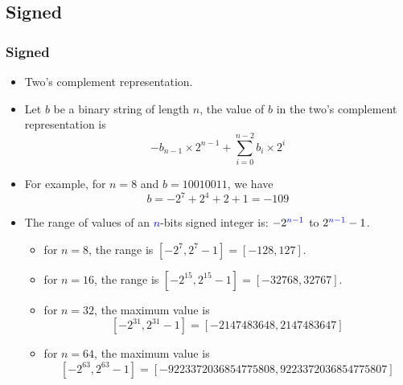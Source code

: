 \documentclass{beamer}
\begin{document}
\subsection{Signed}

\begin{frame}%
\frametitle{Signed}

\scriptsize

\begin{itemize}

\item Two's complement representation.

\item Let $b$ be a binary string of length $n$, the value of $b$ in the two's complement representation is
  $$
  -b_{n-1}\times2^{n-1} + \sum_{i=0}^{n - 2}b_i\times2^i
  $$

\item For example, for $n = 8$ and $b = 10010011$, we have
  $$b = -2^7 + 2^4 + 2 + 1 = -109$$

\item The range of values of an \textcolor{blue}{$n$}-bits signed integer is: $-2^{\textcolor{blue}{n-1}}$ to $2^{\textcolor{blue}{n-1}} - 1$.

  \begin{itemize}
    \scriptsize
  \item for $n = 8$, the range is $[-2^7, 2^{7} - 1] = [-128, 127]$.
  \item for $n = 16$, the range is $[-2^{15}, 2^{15} - 1] = [-32768, 32767]$.
  \item for $n = 32$, the maximum value is
    $$[-2^{31}, 2^{31} - 1] = [-2147483648, 2147483647]$$
  \item for $n = 64$, the maximum value is
    $$[-2^{63}, 2^{63} - 1] = [-9223372036854775808, 9223372036854775807]$$
  \end{itemize}

\end{itemize}

\end{frame}
\end{document}
